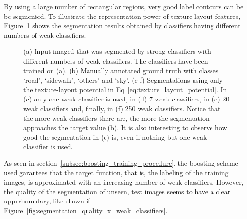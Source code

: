 By using a large number of rectangular regions, very good label contours can be be segmented. To illustrate the representation power of texture-layout features, Figure~\ref{fig:number_tex_lay} shows the segmentation results obtained by classifiers having different numbers of weak classifiers. 

\begin{figure}[htb]
\caption[Influence of number of weak classifiers on segmentation quality]{(a) Input imaged that was segmented by strong classifiers with different numbers of weak classifiers. The classifiers have been trained on (a). (b) Manually annotated ground truth with classes `road', `sidewalk', `others' and `sky'. (c-f) Segmentations using only the texture-layout potential in Eq~\ref{eq:texture_layout_potential}. In (c) only one weak classifier is used, in (d) 7 weak classifiers, in (e) 20 weak classifiers and, finally, in (f) 250 weak classifiers. Notice that the more weak classifiers there are, the more the segmentation approaches the target value (b). It is also interesting to observe how good the segmentation in (c) is, even if nothing but one weak classifier is used. 
}
\label{fig:number_tex_lay}
\end{figure}

As seen in section~\ref{subsec:boosting_training_procedure}, the boosting scheme used garantees that the target function, that is, the labeling of the training images, is approximated with an increasing number of weak classifiers. However, the quality of the segmentation of unseen, test images seems to have a clear upperboundary, like shown if Figure~\ref{fig:segmentation_quality_x_weak_classifiers}. 

